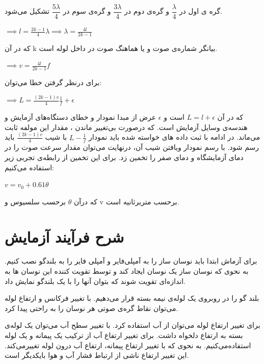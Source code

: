 \documentclass{article}
\begin{document}
گره ی اول در  $\dfrac{\lambda}{4}$ و گره‌ی دوم در  $\dfrac{3\lambda}{4}$ و گره‌ی سوم در  $\dfrac{5\lambda}{4}$ تشکیل می‌شود.

\begin{center}
$
\implies l = \frac{2k-1}{4}\lambda \implies \lambda = \frac{4l}{2k-1}
$
\end{center}

که در آن k بیانگر شماره‌ی صوت و یا هماهنگ صوت در داخل لوله است.


\begin{center}
$
\implies v = \frac{4l}{2k-1}f
$
\end{center}

برای درنظر گرفتن خطا می‌توان:

\begin{center}
$\implies L = \frac{(2k-1)v}{4}\frac{1}{f}+\epsilon$
\end{center}

که در آن $L = l + \epsilon$ است و $\epsilon$ عرض از مبدا نمودار و خطای دستگاه‌های آزمایش و هندسه‌ی وسایل آزمایش است. که درصورت بی‌تغییر ماندن ، مقدار این مولفه ثابت می‌ماند.
در ادامه با ثبت داده های خواسته شده باید نمودار $L - \frac{1}{f}$ با شیب $\frac{(2k-1)v}{4}$ باید رسم شود.
با رسم نمودار ویافتن شیب آن، درنهایت می‌توان مقدار سرعت صوت را در دمای آزمایشگاه و دمای صفر را تخمین زد.
برای این تخمین از رابطه‌ی تجربی زیر استفاده می‌کنیم:

\begin{centering}
$v = v_0 + 0.61\theta$
\end{centering}


که درآن $\theta$ برحسب سلسیوس و v برحسب متربرثانیه است.

\section{شرح فرآیند آزمایش}

برای آزماش ابتدا باید نوسان ساز را به آمپلی‌فایر و آمپلی فایر را به بلندگو نصب کنیم. به نحوی که نوسان ساز یک نوسان ایجاد کند و توسط تقویت کننده این نوسان ها به اندازه‌ای تقویت شوند که بتوان آنها را با یک بلندگو نمایش داد. 

بلند گو را در روبروی یک لوله‌ی نیمه بسته قرار می‌دهیم. با تغییر فرکانس و ارتفاع لوله می‌توان نقاط گره‌ی صوتی هر نوسان را به راحتی پیدا کرد. 

برای تغییر ارتفاع لوله می‌توان از آب استفاده کرد. با تغییر سطح آب می‌توان یک لوله‌ی بسته به ارتفاع دلخواه داشت. برای تغییر ارتفاع آب از ترکیب یک پیمانه و یک لوله استفاده‌می‌کنیم. به نحوی که با تغییر ارتفاع پیمانه، ارتفاع آب درون لوله تغییرمی‌کند.
این تغییر ارتفاع ناشی از ارتباط فشار آب و هوا بایکدیگر است.
\end{document}
